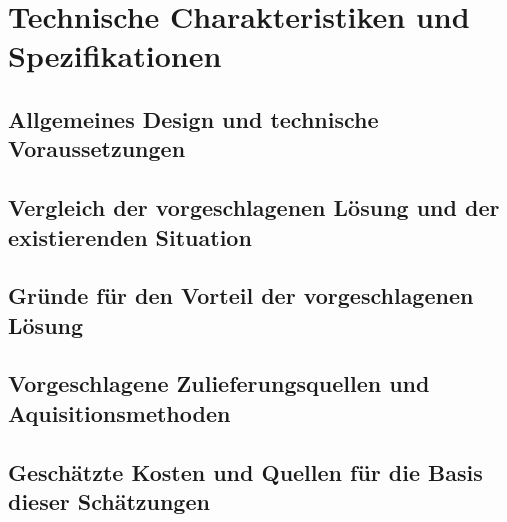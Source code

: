 \chapter{Technische Charakteristiken und Spezifikationen}

\section{Allgemeines Design und technische Voraussetzungen}

\section{Vergleich der vorgeschlagenen Lösung und der existierenden Situation}

\section{Gründe für den Vorteil der vorgeschlagenen Lösung}

\section{Vorgeschlagene Zulieferungsquellen und Aquisitionsmethoden}

\section{Geschätzte Kosten und Quellen für die Basis dieser Schätzungen}
